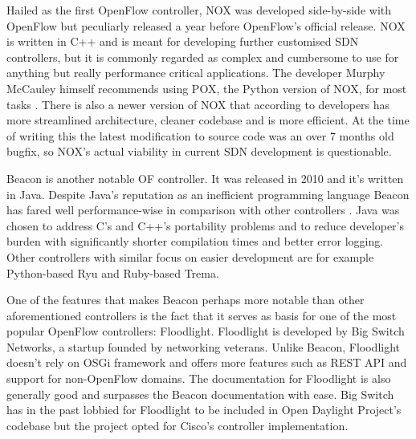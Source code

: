 \documentclass[english]{tktltiki2}
\theoremstyle{definition}
\theoremstyle{remark}
\begin{document}
	Hailed as the first OpenFlow controller, NOX was developed side-by-side with OpenFlow but peculiarly released a year before OpenFlow’s official release. NOX is written in C++ and is meant for developing further customised SDN controllers, but it is commonly regarded as complex and cumbersome to use for anything but really performance critical applications. The developer Murphy McCauley himself recommends using POX, the Python version of NOX, for most tasks \cite{CHU12}. There is also a newer version of NOX that according to developers has more streamlined architecture, cleaner codebase and is more efficient. At the time of writing this the latest modification to source code was an over 7 months old bugfix, so NOX’s actual viability in current SDN development is questionable.

	Beacon is another notable OF controller. It was released in 2010 and it’s written in Java. Despite Java’s reputation as an inefficient programming language Beacon has fared well performance-wise in comparison with other controllers \cite{Erickson13}. Java was chosen to address C’s and C++’s portability problems and to reduce developer’s burden with significantly shorter compilation times and better error logging. Other controllers with similar focus on easier development are for example Python-based Ryu and Ruby-based Trema.

One of the features that makes Beacon perhaps more notable than other aforementioned controllers is the fact that it serves as basis for one of the most popular OpenFlow controllers: Floodlight. Floodlight is developed by Big Switch Networks, a startup founded by networking veterans. Unlike Beacon, Floodlight doesn’t rely on OSGi framework and offers more features such as REST API and support for non-OpenFlow domains. The documentation for Floodlight is also generally good and surpasses the Beacon documentation with ease.
 Big Switch has in the past lobbied for Floodlight to be included in Open Daylight Project’s codebase \cite{BAN13} but the project opted for Cisco’s controller implementation. 
\end{document}
